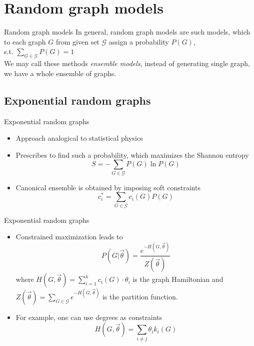 \documentclass{beamer}
\begin{document}
\section{Random graph models}
\begin{frame}{Random graph models}
    In general, random graph models are such models, which to each graph $G$ from given set $\mathcal{G}$ assign a probability $P(G)$, \\ s.t. $\sum_{G \in \mathcal{G}}P(G) = 1$ \\
    \vspace{30px}
    We may call these methods \textit{ensemble models}, instead of generating single graph, we have a whole ensemble of graphs.
\end{frame}

\subsection{Exponential random graphs}

\begin{frame}{Exponential random graphs}
\begin{itemize}
    \item Approach analogical to statistical physics
    \item Prescribes to find such a probability, which maximizes the Shannon entropy
    \begin{equation*}
        S = -\sum_{G \in \mathcal{G}}P(G) \ln P(G)
    \end{equation*}
    \item Canonical ensemble is obtained by imposing soft constraints
    \begin{equation*}
    c_i^* = \sum_{G \in \mathcal{G}} c_i(G)P(G)
    \end{equation*}
\end{itemize}
\end{frame}

\begin{frame}{Exponential random graphs}
\begin{itemize}
    \item Constrained maximization leads to
    \begin{equation*}
    P(G|\vec{\theta}) = \frac{e^{-H(G,\vec{\theta})}}{Z(\vec{\theta})}
\end{equation*}
where $H(G,\vec{\theta}) = \sum_{i=1}^k c_i(G)\cdot\theta_i$ is the graph Hamiltonian and $Z(\vec{\theta}) = \sum_{G \in \mathcal{G}}e^{-H(G,\vec{\theta})}$ is the partition function.
\item For example, one can use degrees as constraints
    \begin{equation}
        H(G,\vec{\theta}) = \sum_{i\neq j}\theta_i k_i(G)
    \end{equation}
\end{itemize}
\end{frame}
\end{document}
